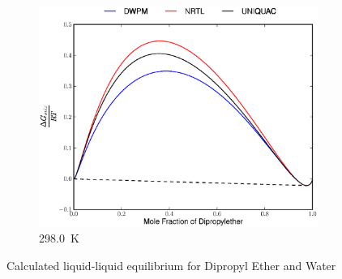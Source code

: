 \vspace*{\fill}
\clearpage
\begin{figure}[hpt]
\ContinuedFloat 
\begin{subfigure}[h]{0.5\textwidth}
	\centering
	\includegraphics[width = \textwidth]{Results_Parts/BinaryParams/dipropylether-water/AllModelsGibbsPlots/T_298.eps}
	\caption{298.0~$\mathrm{K}$}
\end{subfigure}%
\caption[]{Calculated liquid-liquid equilibrium for Dipropyl Ether and Water}
\end{figure}
\clearpage


